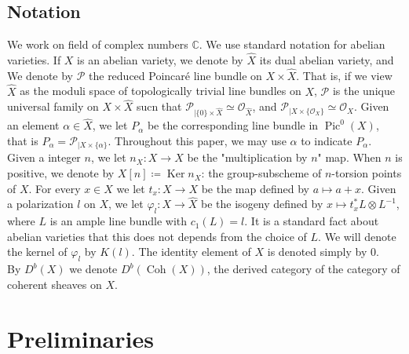 \documentclass[11pt,letter]{amsart}
\numberwithin{equation}{section}
\begin{document}
\subsection*{Notation}
We work on field of complex numbers $\mathbb{C}$. We use standard notation for abelian varieties. If $X$ is an abelian variety, we denote by $\hat{X}$ its dual abelian variety, and  We denote by $\mathscr{P}$ the reduced Poincar\'e line bundle on $X\times \hat X$. That is, if we view $\hat{X}$ as the moduli space of topologically trivial line bundles on $X$, $\mathscr{P}$ is the unique  universal family on $X\times \hat X$ sucn that $\mathscr{P}_{|\{0\}\times \hat{X}}\simeq\mathcal{O}_{\hat{X}}$, and $\mathscr{P}_{|X\times \{\mathcal{O}_X\}}\simeq\mathcal{O}_{X}$. Given an element $\alpha\in\hat{X}$, we let $P_\alpha$ be the corresponding line bundle in $\operatorname{Pic}^0(X)$, that is 
$P_\alpha=\mathscr{P}_{|X\times\{\alpha\}}$. Throughout this paper, we may use $\alpha$ to indicate $P_\alpha$. Given a integer $n$, we let $n_X:X\rightarrow X$ be the "multiplication by $n$" map. When $n$ is positive, we denote by $X[n]\coloneqq \operatorname{Ker}n_X$: the group-subscheme of $n$-torsion points of $X$. For every $x\in X$ we let $t_x:X\rightarrow X$ be the map defined by $a\mapsto a+x$. Given a polarization $l$ on $X$, we let $\varphi_l:X\rightarrow \hat{X}$ be the isogeny defined by $x\mapsto t_x^*L\otimes L^{-1}$, where $L$ is an ample line bundle with $c_1(L)=l$. It is a standard fact about abelian varieties that this does not depends from the choice of $L$. We will denote the  kernel of $\varphi_l$ by $K(l)$. The identity element of $X$ is denoted simply by 0.\\ By $D^b(X)$ we denote $D^b(\operatorname{Coh}(X))$, the derived category of the category of coherent sheaves on $X$.

\section{Preliminaries}\label{sec2}
\end{document}
